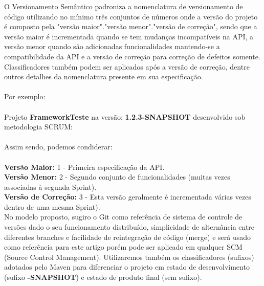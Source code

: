 O Versionamento Sem{\^a}ntico padroniza a nomenclatura de versionamento de c{\'o}digo utilizando no m{\'i}nimo tr{\^e}s conjuntos de n{\'u}meros onde a vers{\~a}o do projeto {\'e} composto pela "vers{\~a}o maior"."vers{\~a}o menor"."vers{\~a}o de corre{\c c}{\~a}o", sendo que a vers{\~a}o maior {\'e} incrementada quando se tem mudan{\c c}as incompat{\'i}veis na API, a vers{\~a}o menor quando s{\~a}o adicionadas funcionalidades mantendo-se a compatibilidade da API e a vers{\~a}o de corre{\c c}{\~a}o para corre{\c c}{\~a}o de defeitos somente. Classificadores tamb{\'e}m podem ser aplicados ap{\'o}s a vers{\~a}o de corre{\c c}{\~a}o, dentre outros detalhes da nomenclatura presente em sua especifica{\c c}{\~a}o.
\\\\
Por exemplo:
\\\\
Projeto \textbf{FrameworkTeste} na vers{\~a}o:\textbf{ 1.2.3-SNAPSHOT} desenvolvido sob metodologia SCRUM:
\\\\
Assim sendo, podemos condiderar:
\\\\
\textbf{Vers{\~a}o Maior:} 1 - Primeira especifica{\c c}{\~a}o da API.\\
\textbf{Vers{\~a}o Menor:} 2 - Segundo conjunto de funcionalidades (muitas vezes associadas à segunda Sprint).\\
\textbf{Vers{\~a}o de Corre{\c c}{\~a}o:} 3 - Esta vers{\~a}o geralmente {\'e} incrementada v{\'a}rias vezes dentro de uma mesma Sprint).\\

No modelo proposto, sugiro o Git como refer{\^e}ncia de sistema de controle de versões dado o seu funcionamento distribu{\'i}do, simplicidade de altern{\^a}ncia entre diferentes branches e facilidade de reintegra{\c c}{\~a}o de c{\'o}digo (merge) e ser{\'a} usado como refer{\^e}ncia para este artigo por{\'e}m pode ser aplicado em qualquer SCM (Source Control Management). Utilizaremos tamb{\'e}m os classificadores (sufixos) adotados pelo Maven para diferenciar o projeto em estado de desenvolvimento (sufixo \textbf{-SNAPSHOT}) e estado de produto final (sem sufixo).

